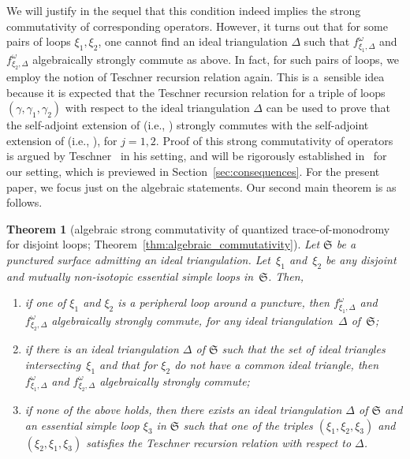 \documentclass[10pt,a4paper]{amsart}
\numberwithin{equation}{section}
\newtheorem{Theorem}{Theorem}[section]
\theoremstyle{definition}
\begin{document}
We will justify in the sequel \cite{sequel} that this condition indeed implies the strong commutativity of corresponding operators. However, it turns out that for some pairs of loops $\xi_1,\xi_2$, one cannot find an ideal triangulation $\Delta$ such that $f^\omega_{\xi_1,\Delta}$ and $f^\omega_{\xi_2,\Delta}$ algebraically strongly commute as above. In fact, for such pairs of loops, we employ the notion of Teschner recursion relation again. This is a~sensible idea because it is expected that the Teschner recursion relation for a triple of loops $(\gamma,\gamma_1,\gamma_2)$ with respect to the ideal triangulation $\Delta$ can be used to prove that the self-adjoint extension of  \big(i.e., \big) strongly commutes with the self-adjoint extension of  \big(i.e., \big), for $j=1,2$. Proof of this strong commutativity of operators is argued by Teschner~\cite{T} in his setting, and will be rigorously established in~\cite{sequel} for our setting, which is previewed in Section~\ref{sec:consequences}. For the present paper, we focus just on the algebraic statements. Our second main theorem is as follows.
\begin{Theorem}[algebraic strong commutativity of quantized trace-of-monodromy for disjoint loops; Theorem~\ref{thm:algebraic_commutativity}]
\label{thm:intro_second_main}
Let $\mathfrak{S}$ be a punctured surface admitting an ideal triangulation. Let~$\xi_1$ and~$\xi_2$ be any disjoint and mutually non-isotopic essential simple loops in~$\mathfrak{S}$. Then,
\begin{enumerate}[label={\rm (\arabic*)}]\itemsep=0pt
\item if one of $\xi_1$ and $\xi_2$ is a peripheral loop around a puncture, then $f^\omega_{\xi_1,\Delta}$ and $f^\omega_{\xi_2,\Delta}$ algebraically strongly commute, for any ideal triangulation~$\Delta$ of~$\mathfrak{S}$;
\item if there is an ideal triangulation $\Delta$ of $\mathfrak{S}$ such that the set of ideal triangles intersecting~$\xi_1$ and that for $\xi_2$ do not have a common ideal triangle, then $f^\omega_{\xi_1,\Delta}$ and $f^\omega_{\xi_2,\Delta}$ algebraically strongly commute;
\item if none of the above holds, then there exists an ideal triangulation $\Delta$ of $\mathfrak{S}$ and an essential simple loop $\xi_3$ in $\mathfrak{S}$ such that one of the triples $(\xi_1,\xi_2,\xi_3)$ and $(\xi_2,\xi_1,\xi_3)$ satisfies the Teschner recursion relation with respect to $\Delta$.
\end{enumerate}
\end{Theorem}
\end{document}
